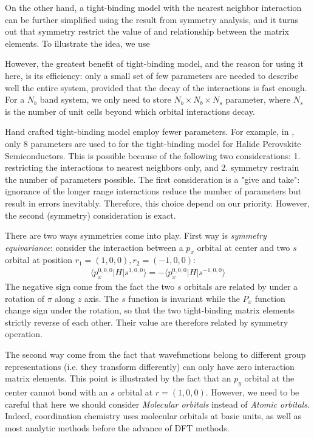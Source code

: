 \documentclass{article}
\begin{document}
On the other hand, a tight-binding model with the nearest neighbor interaction can be further 
simplified using the result from symmetry analysis, and it turns out that 
symmetry restrict the value of and relationship between the matrix elements. To illustrate the idea,
we use 

However, the greatest benefit of tight-binding model, and the reason
for using it here, is its efficiency: only a small set of few parameters are needed
to describe well the entire system, provided that the decay of the interactions is 
fast enough. For a $N_b$ band system, we only need to store $N_b\times N_b \times N_s$ 
parameter, where $N_s$ is the number of unit cells beyond which orbital interactions
decay. 

Hand crafted tight-binding model employ fewer parameters. For example, 
in \cite{boyer-richard_symmetry-based_2016}, only 8 parameters are used to for the 
tight-binding model for Halide Perovskite Semiconductors. This is possible 
because of the following two considerations:
1. restricting the interactions to nearest neighbors only, and
2. symmetry restrain the number of parameters possible.
The first consideration is a "give and take": ignorance of the longer range interactions 
reduce the number of parameters but result in errors inevitably. Therefore, 
this choice depend on our priority. 
However, the second (symmetry) consideration is exact. 

There are two ways symmetries come into play. 
First way is \emph{symmetry equivariance}: consider the interaction between 
a $p_x$ orbital at center and two $s$ orbital at position $r_1 = (1,0,0), r_2 = (-1,0,0)$:
\begin{align}
    \langle p_x^{0,0,0} | H | s^{1,0,0} \rangle = - \langle p_x^{0,0,0} | H | s^{-1,0,0} \rangle
\end{align}
The negative sign come from the fact the two $s$ orbitals are related by 
under a rotation of $\pi$ along $z$ axis. The 
$s$ function is invariant while the $P_x$ function change sign under the rotation, so that the two 
tight-binding matrix elements strictly reverse of each other. Their value are therefore related by 
symmetry operation. 

The second way come from the fact that wavefunctions belong to different group representations  
(i.e. they transform differently)\cite{serre_linear_1996}
can only have zero interaction matrix elements. This point is illustrated by the fact that an 
$p_y$ orbital at the center cannot bond with an $s$ orbital at $r = (1,0,0)$. 
However, we need to be careful that here we should consider \emph{Molecular orbitals} instead 
of \emph{Atomic orbitals}. Indeed, coordination chemistry uses molecular orbitals at basic units,
as well as most analytic methods before the advance of DFT methods. 
\end{document}
